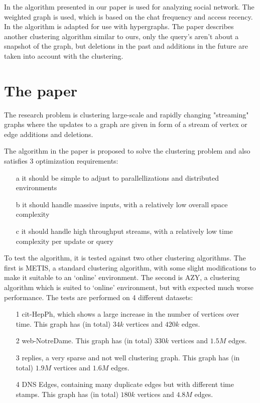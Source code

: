 \documentclass[a4paper,11pt]{article}
\begin{document}
In \cite{DynPar} the algorithm presented in our paper is used for analyzing social network. The weighted graph is used, which is based on the chat frequency and access recency. In \cite{StrHyp} the algorithm is adapted for use with hypergraphs. The paper \cite{ProStr} describes another clustering algorithm similar to ours, only the query's aren't about a snapshot of the graph, but deletions in the past and additions in the future are taken into account with the clustering.





\section{The paper}
The research problem is clustering large-scale and rapidly changing "streaming" graphs where the updates to a graph are given in form of a stream of vertex or edge additions and deletions. 

The algorithm in the paper is proposed to solve the clustering problem and also satisfies 3 optimization requirements:
\begin{itemize}
\item[a] it should be simple to adjust to parallellizations and distributed environments
\item[b] it should handle massive inputs, with a relatively low overall space complexity
\item[c] it should handle high throughput streams, with a relatively low time complexity per update or query
\end{itemize}

To test the algorithm, it is tested against two other clustering algorithms. The first is METIS, a standard clustering algorithm, with some slight modifications to make it suitable to an `online' environment. The second is AZY, a clustering algorithm which is suited to `online' environment, but with expected much worse performance. The tests are performed on 4 different datasets:
\begin{itemize}
\item[1] cit-HepPh, which shows a large increase in the number of vertices over time. This graph has (in total) $34k$ vertices and $420k$ edges.
\item[2] web-NotreDame. This graph has (in total) $330k$ vertices and $1.5M$ edges.
\item[3] replies, a very sparse and not well clustering graph. This graph has (in total) $1.9M$ vertices and $1.6M$ edges.
\item[4] DNS Edges, containing many duplicate edges but with different time stamps. This graph has (in total) $180k$ vertices and $4.8M$ edges.
\end{itemize}
\end{document}
